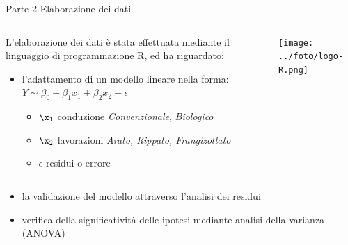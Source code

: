 \documentclass[10pt]{beamer}
\begin{document}
\begin{frame}{Parte 2 \small{Elaborazione dei dati}}
  \begin{minipage}[0.2\textheight]{\textwidth}
    \begin{columns}[T]
      \begin{column}{0.8\textwidth}
        L'elaborazione dei dati è stata effettuata mediante il linguaggio di
        programmazione R, ed ha riguardato:
        \begin{itemize}
          \item l'adattamento di un modello lineare nella forma:
          \vspace{0.25cm}
          $Y \sim \beta_0 + \beta_1x_1 + \beta_2x_2 + \epsilon$

          \begin{itemize}

            \item $\x_1$ conduzione \newline
            \emph{Convenzionale}, \emph{Biologico}

            \item $\x_2$ lavorazioni \newline \emph{Arato, Rippato,
              Frangizollato}

            \item$\epsilon$ residui o errore
          \end{itemize}
        \end{itemize}
      \end{column}
      \begin{column}{0.2\textwidth}
        \texttt{[image: ../foto/logo-R.png]}
      \end{column}
    \end{columns}
  \end{minipage}

  \begin{itemize}
    \item la validazione del modello attraverso l'analisi
    dei residui 
    \item verifica della significatività delle
    ipotesi mediante analisi della varianza (ANOVA)
  \end{itemize}
\end{frame}


\end{document}
